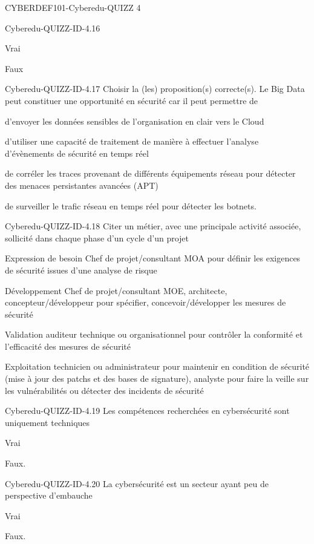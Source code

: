 \documentclass[12pt]{article}
\begin{document}
\begin{quiz}{CYBERDEF101-Cyberedu-QUIZZ 4}
\begin{multi}[multiple=true]{Cyberedu-QUIZZ-ID-4.16}
\item*	Vrai 
\item	Faux
\end{multi}
\begin{multi}[multiple=true]{Cyberedu-QUIZZ-ID-4.17}
Choisir la (les) proposition(s) correcte(s). Le Big Data peut constituer une opportunit\'e en s\'ecurit\'e car il peut permettre de 
\item	d'envoyer les donn\'ees sensibles de l'organisation en clair vers le Cloud 
\item*	d'utiliser une capacit\'e de traitement de mani\`ere \`a effectuer l'analyse d'\'ev\`enements de s\'ecurit\'e en temps r\'eel 
\item*	de corr\'eler les traces provenant de diff\'erents \'equipements r\'eseau pour d\'etecter des menaces persistantes avanc\'ees (APT) 
\item*	de surveiller le trafic r\'eseau en temps r\'eel pour d\'etecter les botnets.
\end{multi}
\begin{multi}[multiple=true]{Cyberedu-QUIZZ-ID-4.18}
Citer un m\'etier, avec une principale activit\'e associ\'ee, sollicit\'e dans chaque phase d'un cycle d'un projet 
\item*	Expression de besoin  Chef de projet/consultant MOA pour d\'efinir les exigences de s\'ecurit\'e issues d'une analyse de risque
\item*	D\'eveloppement  Chef de projet/consultant MOE, architecte, concepteur/d\'eveloppeur  pour sp\'ecifier, concevoir/d\'evelopper les mesures de s\'ecurit\'e
\item*	Validation  auditeur technique ou organisationnel pour contrôler la conformit\'e et l'efficacit\'e des mesures de s\'ecurit\'e
\item*	Exploitation  technicien ou administrateur pour maintenir en condition de s\'ecurit\'e (mise \`a jour des patchs et des bases de signature), analyste pour faire la veille sur les vuln\'erabilit\'es ou d\'etecter des incidents de s\'ecurit\'e
\end{multi}

\begin{multi}[multiple=true]{Cyberedu-QUIZZ-ID-4.19}	
Les comp\'etences recherch\'ees en cybers\'ecurit\'e sont uniquement techniques 
\item Vrai 
\item* Faux.
\end{multi}

\begin{multi}[multiple=true]{Cyberedu-QUIZZ-ID-4.20}
La cybers\'ecurit\'e est un secteur ayant peu de perspective d'embauche 
\item	Vrai 
\item*	Faux.
\end{multi}




  \end{quiz} 
   
\end{document}
